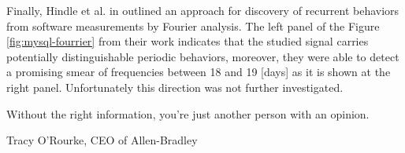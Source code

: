 Finally, Hindle et al. in \cite{citeulike:10377345} outlined an approach for discovery of recurrent behaviors from software 
measurements by Fourier analysis. 
The left panel of the Figure \ref{fig:mysql-fourrier} from their work indicates that the studied signal carries potentially 
distinguishable periodic behaviors, moreover, they were able to detect a promising smear of frequencies between 18 and 19 
[days] as it is shown at the right panel. Unfortunately this direction was not further investigated.

\epigraph{Without the right information, you're just another person with an opinion.}{Tracy O'Rourke, CEO of Allen-Bradley}